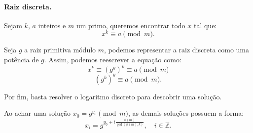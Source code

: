 \paragraph{Raiz discreta.} Sejam $k$, $a$ inteiros e $m$ um primo, queremos encontrar todo $x$ tal que:
$$x^k \equiv a \pmod{m}.$$

Seja $g$ a raiz primitiva módulo $m$, podemos representar a raiz discreta como uma potência de $g$. Assim, podemos reescrever a equação como:
$$x^k \equiv (g^y)^k \equiv a \pmod{m}$$
$$(g^k)^y \equiv a \pmod{m}.$$

Por fim, basta resolver o logaritmo discreto para descobrir uma solução.

Ao achar uma solução $x_0 = g^{y_0} \pmod{m}$, as demais soluções possuem a forma:
$$x_i = g^{y_0+i\frac{\phi(m)}{\gcd(\phi(m),k)}}, \quad i \in \mathbb{Z}.$$
